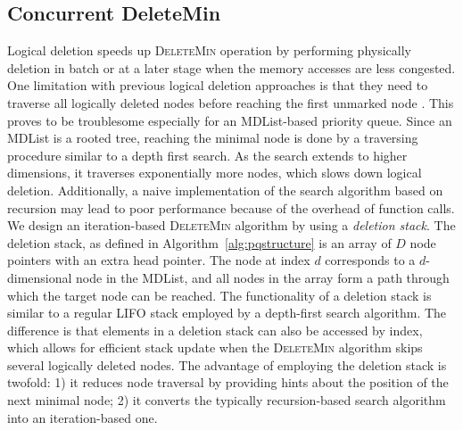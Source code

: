 \documentclass[10pt,journal,letterpaper,compsoc]{IEEEtran}
\begin{document}
\subsection{Concurrent DeleteMin}
\label{sec:cpqueuedel}
Logical deletion speeds up \textsc{DeleteMin} operation by performing physically deletion in batch or at a later stage when the memory accesses are less congested.
One limitation with previous logical deletion approaches is that they need to traverse all logically deleted nodes before reaching the first unmarked node .
This proves to be troublesome especially for an MDList-based priority queue. 
Since an MDList is a rooted tree, reaching the minimal node is done by a traversing procedure similar to a depth first search.
As the search extends to higher dimensions, it traverses exponentially more nodes, which slows down logical deletion.
Additionally, a naive implementation of the search algorithm based on recursion may lead to poor performance because of the overhead of function calls.  
We design an iteration-based \textsc{DeleteMin} algorithm by using a \emph{deletion stack}.
The deletion stack, as defined in Algorithm~\ref{alg:pqstructure} is an array of $D$ node pointers with an extra head pointer.
The node at index $d$ corresponds to a $d$-dimensional node in the MDList, and all nodes in the array form a path through which the target node can be reached.
The functionality of a deletion stack is similar to a regular LIFO stack employed by a depth-first search algorithm.
The difference is that elements in a deletion stack can also be accessed by index, which allows for efficient stack update when the \textsc{DeleteMin} algorithm skips several logically deleted nodes. 
The advantage of employing the deletion stack is twofold: 1) it reduces node traversal by providing hints about the position of the next minimal node; 2) it converts the typically recursion-based search algorithm into an iteration-based one.
\end{document}
